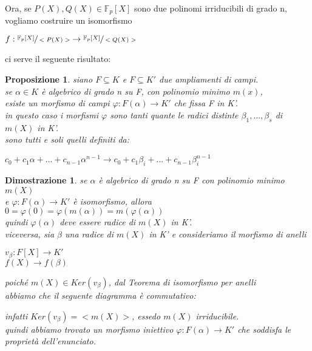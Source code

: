 \documentclass[a4paper,12pt]{article}
\theoremstyle{def}
\theoremstyle{prop}
\newtheorem*{proposition}{Proposizione}
\theoremstyle{esempio}
\theoremstyle{dimostrazione}
\newtheorem*{dimostrazione}{Dimostrazione}
\theoremstyle{teo}
\theoremstyle{osservazione}
\begin{document}
\newpage

Ora, se \(P(X), Q(X) \in \mathbb{F}_p[X]\) sono due polinomi irriducibili di grado n,\\
vogliamo costruire un isomorfismo
\begin{center}
	\(f: \sfrac{\mathbb{F}_p[X]}{<P(X)>} \rightarrow \sfrac{\mathbb{F}_p[X]}{<Q(X)>}\)
\end{center}
ci serve il seguente risultato:

\begin{proposition}
	siano \(F \subseteq K\) e \(F \subseteq K'\) due ampliamenti di campi.\\
	se \(\alpha \in K\) è algebrico di grado n su F, con polinomio minimo \(m(x)\),\\
	esiste un morfismo di campi \(\varphi : F(\alpha) \rightarrow K'\) che fissa F in K'.\\
	in questo caso i morfismi \(\varphi\) sono tanti quante le radici distinte \(\beta_1, ... ,\beta_s\) di \(m(X)\) in K'.\\
	sono tutti e soli quelli definiti da:
	\begin{center}
		\(c_0 + c_1\alpha + ... + c_{n-1}\alpha^{n-1} \rightarrow c_0 + c_1\beta_i + ... + c_{n-1}\beta_i^{n-1} \)
	\end{center}
\end{proposition}

\begin{dimostrazione}
	se \(\alpha\) è algebrico di grado n su F con polinomio minimo \(m(X)\)\\
	e \(\varphi : F(\alpha) \rightarrow K'\) è isomorfismo, allora \(0 = \varphi(0) = \varphi(m(\alpha)) = m(\varphi(\alpha))\)\\
	quindi \(\varphi(\alpha)\) deve essere radice di \(m(X)\) in K'.\\
	viceversa, sia \(\beta\) una radice di \(m(X)\) in K' e consideriamo il morfismo di anelli\\
	\begin{center}
		\(v_\beta : F[X] \rightarrow K'\)\\
		\(f(X) \rightarrow f(\beta)\)
	\end{center}
	poiché \(m(X) \in Ker(v_\beta)\), dal Teorema di isomorfismo per anelli\\
	abbiamo che il seguente diagramma è commutativo:\\
	\begin{center}
	\end{center}
	infatti \(Ker(v_\beta) = <m(X)>\), essedo \(m(X)\) irriducibile.\\
	quindi abbiamo trovato un morfismo iniettivo \(\varphi : F(\alpha) \rightarrow K'\) che soddisfa le proprietà dell'enunciato.\\
\end{dimostrazione}
\end{document}
